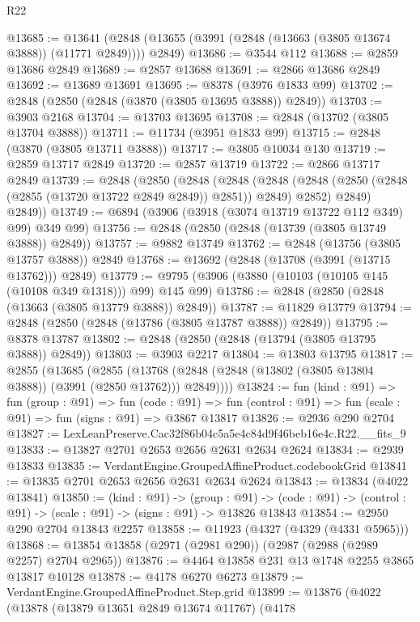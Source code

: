 \begin{lexlean}{R22}
\begin{coremodule}
@13685 := @13641 (@2848 (@13655 (@3991 (@2848 (@13663 (@3805 @13674 @3888)) (@11771 @2849)))) @2849)
@13686 := @3544 @112
@13688 := @2859 @13686 @2849
@13689 := @2857 @13688
@13691 := @2866 @13686 @2849
@13692 := @13689 @13691
@13695 := @8378 (@3976 @1833 @99)
@13702 := @2848 (@2850 (@2848 (@3870 (@3805 @13695 @3888)) @2849))
@13703 := @3903 @2168
@13704 := @13703 @13695
@13708 := @2848 (@13702 (@3805 @13704 @3888))
@13711 := @11734 (@3951 @1833 @99)
@13715 := @2848 (@3870 (@3805 @13711 @3888))
@13717 := @3805 @10034 @130
@13719 := @2859 @13717 @2849
@13720 := @2857 @13719
@13722 := @2866 @13717 @2849
@13739 := @2848
    (@2850
      (@2848
        (@2848
          (@2848 (@2848 (@2850 (@2848 (@2855 (@13720 @13722 @2849 @2849)) @2851)) @2849) @2852)
          @2849)
        @2849))
@13749 := @6894 (@3906 (@3918 (@3074 @13719 @13722 @112 @349) @99) @349 @99)
@13756 := @2848 (@2850 (@2848 (@13739 (@3805 @13749 @3888)) @2849))
@13757 := @9882 @13749
@13762 := @2848 (@13756 (@3805 @13757 @3888)) @2849
@13768 := @13692 (@2848 (@13708 (@3991 (@13715 @13762))) @2849)
@13779 := @9795 (@3906 (@3880 (@10103 (@10105 @145 (@10108 @349 @1318))) @99) @145 @99)
@13786 := @2848 (@2850 (@2848 (@13663 (@3805 @13779 @3888)) @2849))
@13787 := @11829 @13779
@13794 := @2848 (@2850 (@2848 (@13786 (@3805 @13787 @3888)) @2849))
@13795 := @8378 @13787
@13802 := @2848 (@2850 (@2848 (@13794 (@3805 @13795 @3888)) @2849))
@13803 := @3903 @2217
@13804 := @13803 @13795
@13817 := @2855
    (@13685
      (@2855 (@13768 (@2848 (@2848 (@13802 (@3805 @13804 @3888)) (@3991 (@2850 @13762))) @2849))))
@13824 := fun (kind : @91) =>
  fun (group : @91) =>
  fun (code : @91) => fun (control : @91) => fun (scale : @91) => fun (signs : @91) => @3867 @13817
@13826 := @2936 @290 @2704
@13827 := LexLeanPreserve.Cac32f86b04c5a5e4c84d9f46beb16e4c.R22.__fits_9
@13833 := @13827 @2701 @2653 @2656 @2631 @2634 @2624
@13834 := @2939 @13833
@13835 := VerdantEngine.GroupedAffineProduct.codebookGrid
@13841 := @13835 @2701 @2653 @2656 @2631 @2634 @2624
@13843 := @13834 (@4022 @13841)
@13850 := (kind : @91) ->
  (group : @91) ->
  (code : @91) -> (control : @91) -> (scale : @91) -> (signs : @91) -> @13826 @13843
@13854 := @2950 @290 @2704 @13843 @2257
@13858 := @11923 (@4327 (@4329 (@4331 @5965)))
@13868 := @13854 @13858 (@2971 (@2981 @290)) (@2987 (@2988 (@2989 @2257) @2704 @2965))
@13876 := @4464 @13858 @231 @13 @1748 @2255 @3865 @13817 @10128
@13878 := @4178 @6270 @6273
@13879 := VerdantEngine.GroupedAffineProduct.Step.grid
@13899 := @13876
    (@4022
      (@13878
        (@13879 @13651 @2849 @13674 @11767)
        (@4178

\end{coremodule}
\end{lexlean}
